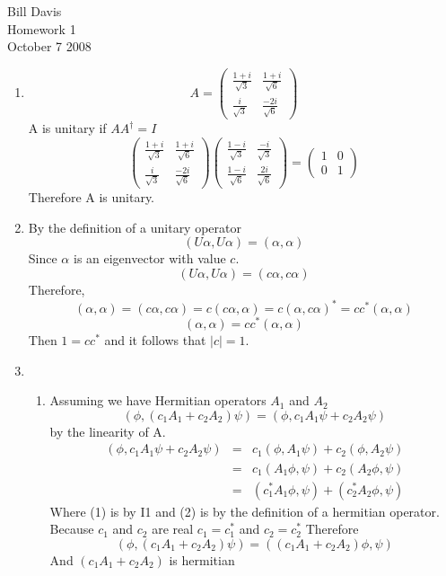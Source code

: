 \documentclass[11pt,fleqn]{article}
\begin{document}
\newcommand{\mbf}[1]{\mbox{{\bfseries #1}}}
\newcommand{\N}{\mbf{N}}
\renewcommand{\O}{\mbf{O}}

\noindent Bill Davis \\
Homework 1 \\
October 7 2008


\begin{enumerate}
\item %
\[ A= \left( \begin{array}{cc}
\frac{1+i}{\sqrt{3}} & \frac{1+i}{\sqrt{6}}  \\
\frac{i}{\sqrt{3}} & \frac{-2i}{\sqrt{6}}  \end{array} \right)\] 
A is unitary if $AA^{\dag}=I$
\[  
\left( \begin{array}{cc}
\frac{1+i}{\sqrt{3}} & \frac{1+i}{\sqrt{6}}  \\
\frac{i}{\sqrt{3}} & \frac{-2i}{\sqrt{6}}  \end{array} \right)
\left( \begin{array}{cc}
\frac{1-i}{\sqrt{3}} & \frac{-i}{\sqrt{3}}  \\
 \frac{1-i}{\sqrt{6}} & \frac{2i}{\sqrt{6}}  \end{array} \right)
 = 
\left( \begin{array}{cc}
1 & 0 \\
0 & 1 \end{array} \right)
\]
Therefore A is unitary.
\item %
By the definition of a unitary operator
\[
(U \alpha, U \alpha) = (\alpha, \alpha) 
\] 
Since $\alpha$ is an eigenvector with value $c$. 
\[
(U \alpha, U \alpha) = (c \alpha, c \alpha)
\]
Therefore,
\[
(\alpha, \alpha)= (c \alpha, c \alpha) = c(c\alpha, \alpha)
 = c(\alpha, c\alpha)^{*} = cc^{*}(\alpha, \alpha)
\]
\[
(\alpha, \alpha) = cc^{*}(\alpha, \alpha)
\]
Then $1= cc^{*}$ and it follows that $|c|=1$.

\item %
\begin{enumerate}
\item 
Assuming we have Hermitian operators $A_{1}$ and $A_{2}$ 
\[
	(\phi , (c_{1}A_{1}+c_{2}A_{2})\psi) = (\phi, c_{1}A_{1}\psi + c_{2}A_{2}\psi)  
\]
by the linearity of A. 
\begin{eqnarray}
(\phi, c_{1}A_{1}\psi + c_{2}A_{2}\psi) &=& c_{1}(\phi,A_{1}\psi) + c_{2}(\phi, A_{2}\psi) \\
&=& c_{1}(A_{1}\phi, \psi)+ c_{2}(A_{2}\phi, \psi) \\
&=& (c_{1}^{*}A_{1}\phi, \psi)+ (c_{2}^{*}A_{2}\phi, \psi) 
\end{eqnarray}
Where (1) is by I1 and (2) is by the definition of a hermitian operator. 
Because $c_{1}$ and $c_{2}$ are real $c_{1}=c_{1}^{*}$ and $c_{2}=c_{2}^{*}$
Therefore 
\[
(\phi , (c_{1}A_{1}+c_{2}A_{2})\psi) = ((c_{1}A_{1}+c_{2}A_{2})\phi, \psi)
\]
And $(c_{1}A_{1}+c_{2}A_{2})$ is hermitian


\end{enumerate}
\end{enumerate}
\end{document}
